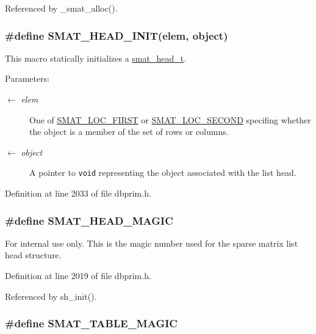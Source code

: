 Referenced by \_\-smat\_\-alloc().\hypertarget{group__dbprim__smat_ga42}{
\subsubsection[SMAT\_\-HEAD\_\-INIT]{\setlength{\rightskip}{0pt plus 5cm}\#define SMAT\_\-HEAD\_\-INIT(elem, object)}}
\label{group__dbprim__smat_ga42}


This macro statically initializes a \hyperlink{group__dbprim__smat_ga1}{smat\_\-head\_\-t}.

\begin{Desc}
\item[Parameters:]
\begin{description}
\item[\mbox{$\leftarrow$} {\em elem}]One of \hyperlink{group__dbprim__smat_gga70a137}{SMAT\_\-LOC\_\-FIRST} or \hyperlink{group__dbprim__smat_gga70a138}{SMAT\_\-LOC\_\-SECOND} specifing whether the object is a member of the set of rows or columns. \item[\mbox{$\leftarrow$} {\em object}]A pointer to {\tt void} representing the object associated with the list head.\end{description}
\end{Desc}


Definition at line 2033 of file dbprim.h.\hypertarget{group__dbprim__smat_ga41}{
\subsubsection[SMAT\_\-HEAD\_\-MAGIC]{\setlength{\rightskip}{0pt plus 5cm}\#define SMAT\_\-HEAD\_\-MAGIC}}
\label{group__dbprim__smat_ga41}


\begin{Desc}
\item[For internal use only.]
This is the magic number used for the sparse matrix list head structure.\end{Desc}


Definition at line 2019 of file dbprim.h.

Referenced by sh\_\-init().\hypertarget{group__dbprim__smat_ga33}{
\subsubsection[SMAT\_\-TABLE\_\-MAGIC]{\setlength{\rightskip}{0pt plus 5cm}\#define SMAT\_\-TABLE\_\-MAGIC}}
\label{group__dbprim__smat_ga33}


